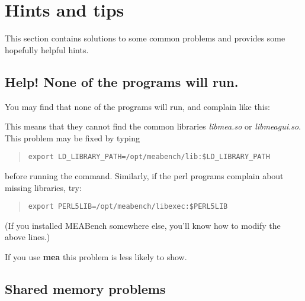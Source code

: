 \documentclass[12pt,oneside]{book}
\renewcommand{\sectionmark}[1]{}
\def\meabench{{MEABench}\xspace}
\def\prog#1{{\bf #1}}
\begin{document}

\renewcommand{\sectionmark}[1]{}

\chapter{Hints and tips}\label{chap:help}

This section contains solutions to some common problems and provides
some hopefully helpful hints.


\section{Help! None of the programs will run.}

You may find that none of the programs will run, and complain like
this:
\begin{quotation}
\end{quotation}
This means that they cannot find the common libraries \emph{libmea.so}
or \emph{libmeagui.so}. This problem may be fixed by typing
\begin{quotation}
\noindent\verb+export LD_LIBRARY_PATH=/opt/meabench/lib:$LD_LIBRARY_PATH+ %
\end{quotation}
before running the command. Similarly, if the perl programs complain about missing libraries, try:
\begin{quotation}
\noindent\verb+export PERL5LIB=/opt/meabench/libexec:$PERL5LIB+%
\end{quotation}
(If you installed \meabench somewhere else, you'll know how to
modify the above lines.)

If you use \prog{mea}
this problem is less likely to show.

\section{Shared memory problems}
\end{document}
